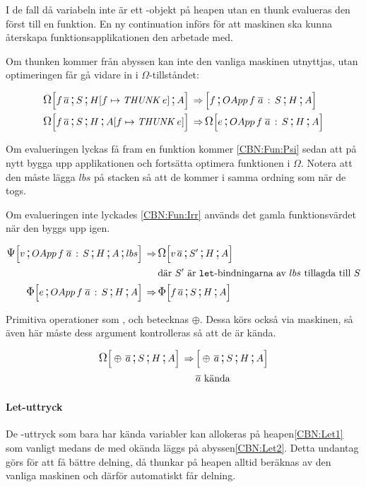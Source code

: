 \documentclass[../Optimise]{subfiles}
\begin{document}
I de fall då variabeln inte är ett -objekt på heapen utan en thunk evalueras den först
till en funktion. En ny continuation  införs för att maskinen
ska kunna återskapa funktionsapplikationen den arbetade med.

Om thunken kommer från abyssen kan inte den vanliga maskinen utnyttjas, utan optimeringen får
gå vidare in i $\Omega$-tillståndet:

\begin{align}
\CBNOMEGA S{\heap f{\THUNK e}}A{f\, \many{a}}  \rulesep & \CBNMC f{\cOApp f{\many{a}}S}HA\\
\CBNOMEGA SH{\abyss f{\THUNK e}}{f\, \many{a}}  \rulesep & \CBNOMEGA{\cOApp f{\many{a}}S}HAe
\end{align}

Om evalueringen lyckas få fram en funktion kommer \eqref{CBN:Fun:Psi} sedan att
på nytt bygga upp applikationen och fortsätta optimera funktionen i $\Omega$.
Notera att den måste lägga $lbs$ på stacken så att de kommer i samma ordning som när de togs.

Om evalueringen inte lyckades \eqref{CBN:Fun:Irr} används det gamla funktionsvärdet
när den byggs upp igen.

\begin{align}
\label{CBN:Fun:Psi}\CBNPSI{\cOApp f{\many{a}}S}HA{lbs}v  \rulesep & \CBNOMEGA {S'}HA{v\, \many{a}} \\
 & \text{där } S' \text{ är \kw{let}-bindningarna av } lbs \text{ tillagda till } S \nonumber \\
\label{CBN:Fun:Irr}\CBNIRR {\cOApp f {\many{a}}S}HAe  \rulesep & \CBNIRR SHA{f\, \many{a}}
\end{align}

Primitiva operationer som \ic{+\#}, \ic{*\#} och \ic{==\#} betecknas $\oplus$. 
Dessa körs också via maskinen, så även här måste dess argument kontrolleras så att de är kända.

\begin{align}
\CBNOMEGA SHA{\oplus\, \many{a}}  \rulesep & \CBNMC{\oplus\, \many{a}}SHA \\
 & \many{a} \text{ kända } \nonumber
\end{align}


\paragraph{Let-uttryck}
De -uttryck som bara har kända variabler kan allokeras på heapen\eqref{CBN:Let1} som vanligt
medans de med okända läggs på abyssen\eqref{CBN:Let2}.
Detta undantag görs för att få bättre delning, då thunkar på heapen alltid beräknas
av den vanliga maskinen och därför automatiskt får delning.
\end{document}
